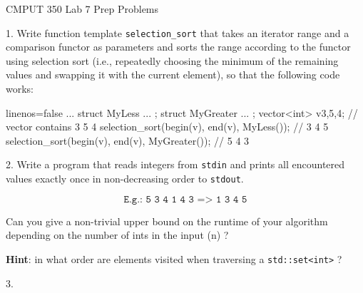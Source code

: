 \documentclass[a4paper,11pt]{article}
\begin{document}

\begin{center}
{\Large CMPUT 350 Lab 7 Prep Problems}
\end{center}


\linerule

1. Write function template \texttt{selection\_sort} that takes an iterator range and
a comparison functor as parameters and sorts the range according to the
functor using selection sort (i.e., repeatedly choosing the minimum of the
remaining values and swapping it with the current element), so that the 
following code works:

\begin{cppcode*}{linenos=false}
...
struct MyLess { ... };
struct MyGreater { ... };
vector<int> v{3,5,4};       // vector contains 3 5 4
selection_sort(begin(v), end(v), MyLess());         // 3 4 5
selection_sort(begin(v), end(v), MyGreater());      // 5 4 3
\end{cppcode*}

\linerule 

2. Write a program that reads integers from \texttt{stdin} and prints all encountered
values exactly once in non-decreasing order to \texttt{stdout}.

\[ \texttt{E.g.: 5 3 4 1 4 3 => 1 3 4 5} \]

Can you give a non-trivial upper bound on the runtime of your algorithm
depending on the number of ints in the input (n) ?

\medskip

\textbf{Hint}: in what order are elements visited when traversing a \texttt{std::set<int>} ?

\linerule 

3. 
\end{document}
